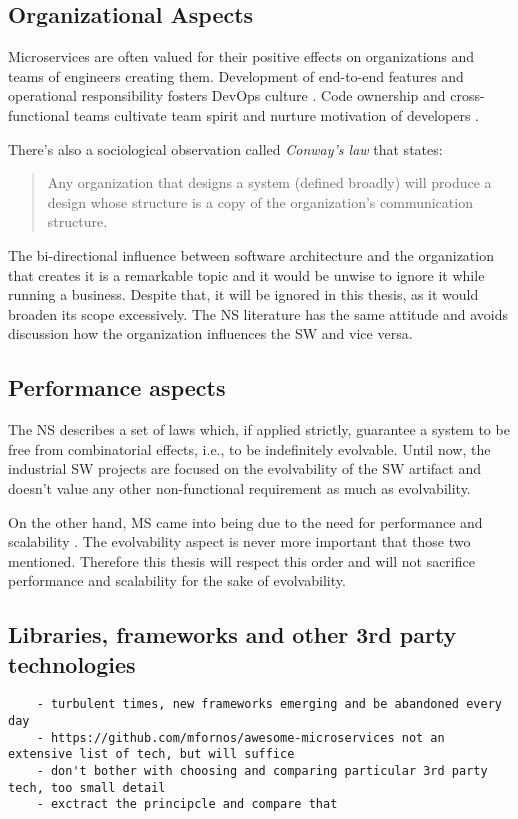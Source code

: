 \documentclass[thesis=M,english,hidelinks]{FITthesis}[2012/10/20]
\begin{document}
\subsection{Organizational Aspects}
Microservices are often valued for their positive effects on organizations and teams of engineers creating them. Development of end-to-end features and operational responsibility fosters DevOps culture \cite{devops-what-is}. Code ownership and cross-functional teams cultivate team spirit and nurture motivation of developers \cite{ms-fow-new-term-def, ms-modelling-with-petter, ms-building-ms}.

There's also a sociological observation called \textit{Conway's law} that states:
\begin{quote}
Any organization that designs a system (defined broadly) will produce a design whose structure is a copy of the organization's communication structure. \cite{conways-law}
\end{quote}

The bi-directional influence between software architecture and the organization that creates it is a remarkable topic and it would be unwise to ignore it while running a business. Despite that, it will be ignored in this thesis, as it would broaden its scope excessively. The \acrshort{NS} literature \cite{ns-recreating, ns-toward-general-theory} has the same attitude and avoids discussion how the organization influences the \acrshort{SW} and vice versa.

\subsection{Performance aspects}
The \acrlong{NS} describes a set of laws which, if applied strictly, guarantee a system to be free from combinatorial effects, i.e., to be indefinitely evolvable. Until now, the industrial \acrlong{SW} projects \cite{ns-it-isnt-different, ns-exploring-defence} are focused on the evolvability of the \acrshort{SW} artifact and doesn't value any other non-functional requirement as much as evolvability.

On the other hand, \acrlong{MS} came into being due to the need for performance and scalability \cite{ms-building-ms, ms-evolutionary-arch}. The evolvability aspect is never more important that those two mentioned. Therefore this thesis will respect this order and will not sacrifice performance and scalability for the sake of evolvability.

\subsection{Libraries, frameworks and other 3rd party technologies}
\begin{verbatim}
    - turbulent times, new frameworks emerging and be abandoned every day
    - https://github.com/mfornos/awesome-microservices not an extensive list of tech, but will suffice
    - don't bother with choosing and comparing particular 3rd party tech, too small detail
    - exctract the principcle and compare that
\end{verbatim}
\end{document}
